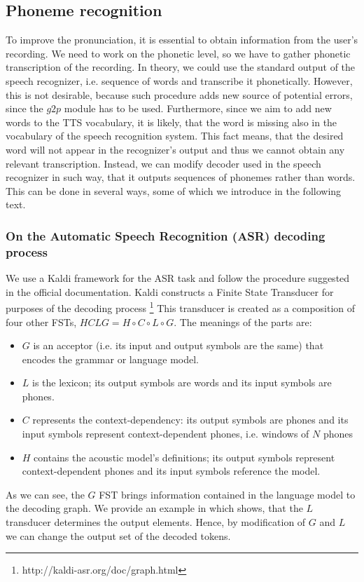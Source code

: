 \subsection{Phoneme recognition}
To improve the pronunciation, it is essential to obtain information from the user's recording.
We need to work on the phonetic level, so we have to gather phonetic transcription of the recording.
In theory, we could use the standard output of the speech recognizer, i.e. sequence of words and transcribe it phonetically.
However, this is not desirable, because such procedure adds new source of potential errors, since the $g2p$ module has to be used.
Furthermore, since we aim to add new words to the TTS vocabulary, it is likely, that the word is missing also in the vocabulary of the speech recognition system.
This fact means, that the desired word will not appear in the recognizer's output and thus we cannot obtain any relevant transcription.
Instead, we can modify decoder used in the speech recognizer in such way, that it outputs sequences of phonemes rather than words.
This can be done in several ways, some of which we introduce in the following text.
\subsubsection{On the Automatic Speech Recognition (ASR) decoding process}
We use a Kaldi framework for the ASR task and follow the procedure suggested in the official documentation.
Kaldi constructs a Finite State Transducer for purposes of the decoding process \footnote{http://kaldi-asr.org/doc/graph.html}
This transducer is created as a composition of four other FSTs, $HCLG = H \circ C \circ L \circ G$.
The meanings of the parts are:
\begin{itemize}
\item $G$ is an acceptor (i.e. its input and output symbols are the same) that encodes the grammar or language model.
\item $L$ is the lexicon; its output symbols are words and its input symbols are phones.
\item $C$ represents the context-dependency: its output symbols are phones and its input symbols represent context-dependent phones, i.e. windows of $N$ phones
\item $H$ contains the acoustic model's definitions; its output symbols represent context-dependent phones and its input symbols reference the model.
\end{itemize}
As we can see, the $G$ FST brings information contained in the language model to the decoding graph.
We provide an example in  which shows, that the $L$ transducer determines the output elements.
Hence, by modification of $G$ and $L$ we can change the output set of the decoded tokens.
